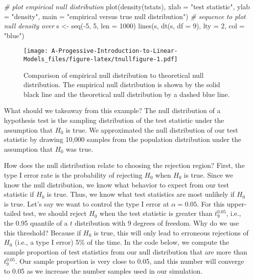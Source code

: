 \documentclass[
]{book}
\newenvironment{Shaded}{\begin{snugshade}}{\end{snugshade}}
\newcommand{\AttributeTok}[1]{\textcolor[rgb]{0.77,0.63,0.00}{#1}}
\newcommand{\CommentTok}[1]{\textcolor[rgb]{0.56,0.35,0.01}{\textit{#1}}}
\newcommand{\DecValTok}[1]{\textcolor[rgb]{0.00,0.00,0.81}{#1}}
\newcommand{\FunctionTok}[1]{\textcolor[rgb]{0.00,0.00,0.00}{#1}}
\newcommand{\NormalTok}[1]{#1}
\newcommand{\OtherTok}[1]{\textcolor[rgb]{0.56,0.35,0.01}{#1}}
\newcommand{\SpecialCharTok}[1]{\textcolor[rgb]{0.00,0.00,0.00}{#1}}
\newcommand{\StringTok}[1]{\textcolor[rgb]{0.31,0.60,0.02}{#1}}
\theoremstyle{definition}
\theoremstyle{definition}
\theoremstyle{definition}
\theoremstyle{definition}
\theoremstyle{remark}
\begin{document}
\begin{Shaded}
\begin{Highlighting}[]
\CommentTok{\# plot empirical null distribution}
\FunctionTok{plot}\NormalTok{(}\FunctionTok{density}\NormalTok{(tstats),}
     \AttributeTok{xlab =} \StringTok{"test statistic"}\NormalTok{,}
     \AttributeTok{ylab =} \StringTok{"density"}\NormalTok{,}
     \AttributeTok{main =} \StringTok{"empirical versus true null distribution"}\NormalTok{)}
\CommentTok{\# sequence to plot null density over}
\NormalTok{s }\OtherTok{\textless{}{-}} \FunctionTok{seq}\NormalTok{(}\SpecialCharTok{{-}}\DecValTok{5}\NormalTok{, }\DecValTok{5}\NormalTok{, }\AttributeTok{len =} \DecValTok{1000}\NormalTok{)}
\FunctionTok{lines}\NormalTok{(s, }\FunctionTok{dt}\NormalTok{(s, }\AttributeTok{df =} \DecValTok{9}\NormalTok{), }\AttributeTok{lty =} \DecValTok{2}\NormalTok{, }\AttributeTok{col =} \StringTok{"blue"}\NormalTok{)}
\end{Highlighting}
\end{Shaded}

\begin{figure}
\centering
\texttt{[image: A-Progessive-Introduction-to-Linear-Models\_files/figure-latex/tnullfigure-1.pdf]}
\caption{\label{fig:tnullfigure}Comparison of empirical null distribution to theoretical null distribution. The empirical null distribution is shown by the solid black line and the theoretical null distribution by a dashed blue line.}
\end{figure}

What should we takeaway from this example? The null distribution of a hypothesis test is the sampling distribution of the test statistic under the assumption that \(H_0\) is true. We approximated the null distribution of our test statistic by drawing 10,000 samples from the population distribution under the assumption that \(H_0\) was true.

How does the null distribution relate to choosing the rejection region? First, the type I error rate is the probability of rejecting \(H_0\) when \(H_0\) is true. Since we know the null distribution, we know what behavior to expect from our test statistic if \(H_0\) is true. Thus, we know what test statistics are most unlikely if \(H_0\) is true. Let's say we want to control the type I error at \(\alpha = 0.05\). For this upper-tailed test, we should reject \(H_0\) when the test statistic is greater than \(t^{0.05}_9\), i.e., the 0.95 quantile of a \(t\) distribution with 9 degrees of freedom. Why do we use this threshold? Because if \(H_0\) is true, this will only lead to erroneous rejections of \(H_0\) (i.e., a type I error) 5\% of the time. In the code below, we compute the sample proportion of test statistics from our null distribution that are more than \(t^{0.05}_9\). Our sample proportion is very close to 0.05, and this number will converge to 0.05 as we increase the number samples used in our simulation.
\end{document}
